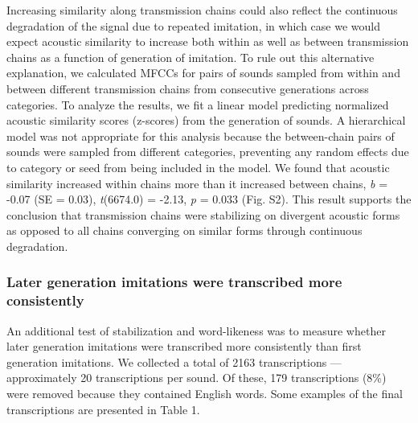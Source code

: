 \documentclass[english,floatsintext,man]{apa6}
\theoremstyle{definition}
\theoremstyle{definition}
\theoremstyle{definition}
\theoremstyle{remark}
\begin{document}
Increasing similarity along transmission chains could also reflect the
continuous degradation of the signal due to repeated imitation, in which
case we would expect acoustic similarity to increase both within as well
as between transmission chains as a function of generation of imitation.
To rule out this alternative explanation, we calculated MFCCs for pairs
of sounds sampled from within and between different transmission chains
from consecutive generations across categories. To analyze the results,
we fit a linear model predicting normalized acoustic similarity scores
(z-scores) from the generation of sounds. A hierarchical model was not
appropriate for this analysis because the between-chain pairs of sounds
were sampled from different categories, preventing any random effects
due to category or seed from being included in the model. We found that
acoustic similarity increased within chains more than it increased
between chains, \emph{b} = -0.07 (SE = 0.03), \emph{t}(6674.0) = -2.13,
\emph{p} = 0.033 (Fig. S2). This result supports the conclusion that
transmission chains were stabilizing on divergent acoustic forms as
opposed to all chains converging on similar forms through continuous
degradation.

\hypertarget{later-generation-imitations-were-transcribed-more-consistently}{%
\subsubsection{Later generation imitations were transcribed more
consistently}\label{later-generation-imitations-were-transcribed-more-consistently}}

An additional test of stabilization and word-likeness was to measure
whether later generation imitations were transcribed more consistently
than first generation imitations. We collected a total of 2163
transcriptions --- approximately 20 transcriptions per sound. Of these,
179 transcriptions (8\%) were removed because they contained English
words. Some examples of the final transcriptions are presented in Table
1.
\end{document}
